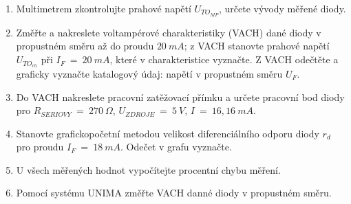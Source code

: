 \begin{minipage}[H][11.48cm][c]{0.8\textwidth}
  \begin{enumerate}
    \item
      Multimetrem zkontrolujte prahové napětí $U_{TO_{MP}}$, určete vývody měřené diody.
    \item
      Změřte a nakreslete voltampérové charakteristiky (VACH) dané diody v propustném směru až do proudu $20~mA$; z VACH stanovte prahové napětí $U_{TO_{ch}}$ při $I_F~=~20~mA$, které v charakteristice vyznačte. Z VACH odečtěte a graficky vyznačte katalogový údaj: napětí v propustném směru $U_F$.
    \item
Do VACH nakreslete pracovní zatěžovací přímku a určete pracovní bod diody pro $R_{SERIOVY}~=~270~\Omega$, $U_{ZDROJE}~=~5~V$, $I~=~16,16~mA$.
    \item
      Stanovte grafickopočetní metodou velikost diferenciálního odporu diody $r_d$ pro proudu $I_F~=~18~mA$. Odečet v grafu vyznačte.
    \item
      U všech měřených hodnot vypočítejte procentní chybu měření.
		\item
			Pomocí systému UNIMA změřte VACH danné diody v propustném směru.
	\end{enumerate}
\end{minipage}



